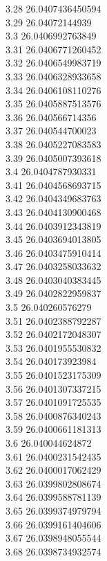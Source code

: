{3.28	26.0407436450594\\
3.29	26.04072144939\\
3.3	26.0406992763849\\
3.31	26.0406771260452\\
3.32	26.0406549983719\\
3.33	26.0406328933658\\
3.34	26.0406108110276\\
3.35	26.0405887513576\\
3.36	26.040566714356\\
3.37	26.040544700023\\
3.38	26.0405227083583\\
3.39	26.0405007393618\\
3.4	26.0404787930331\\
3.41	26.0404568693715\\
3.42	26.0404349683763\\
3.43	26.0404130900468\\
3.44	26.0403912343819\\
3.45	26.0403694013805\\
3.46	26.0403475910414\\
3.47	26.0403258033632\\
3.48	26.0403040383445\\
3.49	26.0402822959837\\
3.5	26.040260576279\\
3.51	26.0402388792287\\
3.52	26.0402172048307\\
3.53	26.0401955530832\\
3.54	26.040173923984\\
3.55	26.0401523175309\\
3.56	26.0401307337215\\
3.57	26.0401091725535\\
3.58	26.0400876340243\\
3.59	26.0400661181313\\
3.6	26.040044624872\\
3.61	26.0400231542435\\
3.62	26.0400017062429\\
3.63	26.0399802808674\\
3.64	26.0399588781139\\
3.65	26.0399374979794\\
3.66	26.0399161404606\\
3.67	26.0398948055544\\
3.68	26.0398734932574\\
}
